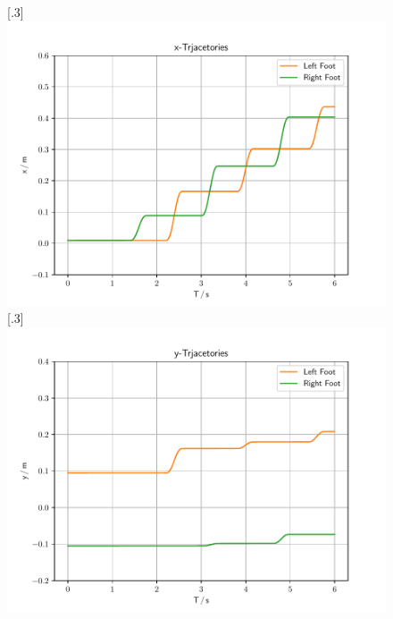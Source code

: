 \begin{figure}[h]
	\centering
	[.3\linewidth]{\includegraphics[scale=.3]{chapters/05_experiments/01_user_controlled_walking/01_benchmarking/interpolated_x_trajectories.pdf}}
	[.3\linewidth]{\includegraphics[scale=.3]{chapters/05_experiments/01_user_controlled_walking/01_benchmarking/interpolated_y_trajectories.pdf}}

\end{figure}
